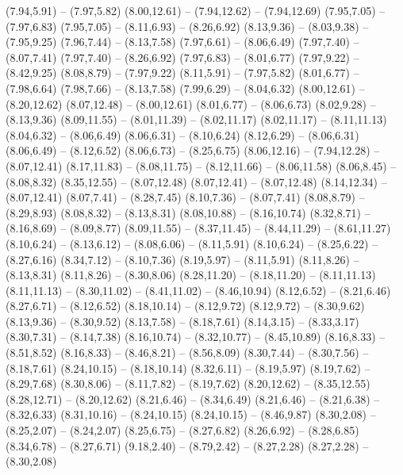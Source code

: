 {  (7.94,5.91) -- (7.97,5.82)
  (8.00,12.61) -- (7.94,12.62) -- (7.94,12.69)
  (7.95,7.05) -- (7.97,6.83)
  (7.95,7.05) -- (8.11,6.93) -- (8.26,6.92)
  (8.13,9.36) -- (8.03,9.38) -- (7.95,9.25)
  (7.96,7.44) -- (8.13,7.58)
  (7.97,6.61) -- (8.06,6.49)
  (7.97,7.40) -- (8.07,7.41)
  (7.97,7.40) -- (8.26,6.92)
  (7.97,6.83) -- (8.01,6.77)
  (7.97,9.22) -- (8.42,9.25)
  (8.08,8.79) -- (7.97,9.22)
  (8.11,5.91) -- (7.97,5.82)
  (8.01,6.77) -- (7.98,6.64)
  (7.98,7.66) -- (8.13,7.58)
  (7.99,6.29) -- (8.04,6.32)
  (8.00,12.61) -- (8.20,12.62)
  (8.07,12.48) -- (8.00,12.61)
  (8.01,6.77) -- (8.06,6.73)
  (8.02,9.28) -- (8.13,9.36)
  (8.09,11.55) -- (8.01,11.39) -- (8.02,11.17)
  (8.02,11.17) -- (8.11,11.13)
  (8.04,6.32) -- (8.06,6.49)
  (8.06,6.31) -- (8.10,6.24)
  (8.12,6.29) -- (8.06,6.31)
  (8.06,6.49) -- (8.12,6.52)
  (8.06,6.73) -- (8.25,6.75)
  (8.06,12.16) -- (7.94,12.28) -- (8.07,12.41)
  (8.17,11.83) -- (8.08,11.75) -- (8.12,11.66) -- (8.06,11.58)
  (8.06,8.45) -- (8.08,8.32)
  (8.35,12.55) -- (8.07,12.48)
  (8.07,12.41) -- (8.07,12.48)
  (8.14,12.34) -- (8.07,12.41)
  (8.07,7.41) -- (8.28,7.45)
  (8.10,7.36) -- (8.07,7.41)
  (8.08,8.79) -- (8.29,8.93)
  (8.08,8.32) -- (8.13,8.31)
  (8.08,10.88) -- (8.16,10.74)
  (8.32,8.71) -- (8.16,8.69) -- (8.09,8.77)
  (8.09,11.55) -- (8.37,11.45) -- (8.44,11.29) -- (8.61,11.27)
  (8.10,6.24) -- (8.13,6.12) -- (8.08,6.06) -- (8.11,5.91)
  (8.10,6.24) -- (8.25,6.22) -- (8.27,6.16)
  (8.34,7.12) -- (8.10,7.36)
  (8.19,5.97) -- (8.11,5.91)
  (8.11,8.26) -- (8.13,8.31)
  (8.11,8.26) -- (8.30,8.06)
  (8.28,11.20) -- (8.18,11.20) -- (8.11,11.13)
  (8.11,11.13) -- (8.30,11.02) -- (8.41,11.02) -- (8.46,10.94)
  (8.12,6.52) -- (8.21,6.46)
  (8.27,6.71) -- (8.12,6.52)
  (8.18,10.14) -- (8.12,9.72)
  (8.12,9.72) -- (8.30,9.62)
  (8.13,9.36) -- (8.30,9.52)
  (8.13,7.58) -- (8.18,7.61)
  (8.14,3.15) -- (8.33,3.17)
  (8.30,7.31) -- (8.14,7.38)
  (8.16,10.74) -- (8.32,10.77) -- (8.45,10.89)
  (8.16,8.33) -- (8.51,8.52)
  (8.16,8.33) -- (8.46,8.21) -- (8.56,8.09)
  (8.30,7.44) -- (8.30,7.56) -- (8.18,7.61)
  (8.24,10.15) -- (8.18,10.14)
  (8.32,6.11) -- (8.19,5.97)
  (8.19,7.62) -- (8.29,7.68)
  (8.30,8.06) -- (8.11,7.82) -- (8.19,7.62)
  (8.20,12.62) -- (8.35,12.55)
  (8.28,12.71) -- (8.20,12.62)
  (8.21,6.46) -- (8.34,6.49)
  (8.21,6.46) -- (8.21,6.38) -- (8.32,6.33)
  (8.31,10.16) -- (8.24,10.15)
  (8.24,10.15) -- (8.46,9.87)
  (8.30,2.08) -- (8.25,2.07) -- (8.24,2.07)
  (8.25,6.75) -- (8.27,6.82)
  (8.26,6.92) -- (8.28,6.85)
  (8.34,6.78) -- (8.27,6.71)
  (9.18,2.40) -- (8.79,2.42) -- (8.27,2.28)
  (8.27,2.28) -- (8.30,2.08)
}

